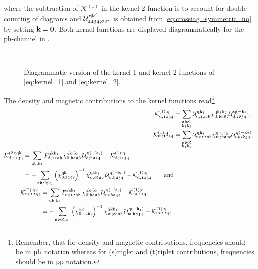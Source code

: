 \documentclass[../../main.tex]{subfiles}
\begin{document}
where the subtraction of $\mathcal{K}^{(1)}$ in the kernel-2 function is to account for double-counting of diagrams and $\mathcal{U}^{\textbf{qk}'}_{\mathfrak{1234};\sigma\sigma'}$ is obtained from \eqref{eq:crossing_symmetric_uq} by setting $\textbf{k}=\textbf{0}$. Both kernel functions are displayed diagrammatically for the ph-channel in .
\begin{figure}[ht!]
  \centering
  \subfloat{}\\[0.5cm]
  \hspace{-0.25cm}\subfloat{}
  \caption{Diagrammatic version of the kernel-1 and kernel-2 functions of \eqref{eq:kernel_1} and \eqref{eq:kernel_2}.}
  \label{fig:kernel_functions}
\end{figure}
The density and magnetic contributions to the kernel functions read\footnote{Remember, that for density and magnetic contributions, frequencies should be in $\text{ph}$ notation whereas for (s)inglet and (t)riplet contributions, frequencies should be in $\text{pp}$ notation.}
\begin{subequations}\label{eq:kernel_functions_dens_magn}
\begin{align}
	\mathcal{K}^{(1);\text{q}}_{\text{d};\mathfrak{1234}}&=\sum_{\substack{\mathfrak{abcd}\\\text{k}_1\text{k}_2}} \mathcal{U}^{\textbf{q}\textbf{k}_1}_{\text{d};\mathfrak{12ab}} \chi^{\text{q}\text{k}_1\text{k}_2}_{\text{d};\mathfrak{badc}} \mathcal{U}^{\textbf{q}(-\textbf{k}_2)}_{\text{d};\mathfrak{cd34}},\\
	\mathcal{K}^{(1);\text{q}}_{\text{m};\mathfrak{1234}}&=\sum_{\substack{\mathfrak{abcd}\\\text{k}_1\text{k}_2}} \mathcal{U}^{\textbf{q}\textbf{k}_1}_{\text{m};\mathfrak{12ab}} \chi^{\text{q}\text{k}_1\text{k}_2}_{\text{m};\mathfrak{badc}} \mathcal{U}^{\textbf{q}(-\textbf{k}_2)}_{\text{m};\mathfrak{cd34}},\\
\begin{split}
	\mathcal{K}^{(2);\text{q}\text{k}}_{\text{d};\mathfrak{1234}}&=\sum_{\mathfrak{ab};\text{k}_1} F^{\text{q}\text{k}\text{k}_1}_{\text{d};\mathfrak{12ab}}\,\chi^{\text{q}\text{k}_1\text{k}_1}_{0;\mathfrak{baab}}\,\mathcal{U}^{\textbf{q}(-\textbf{k}_1)}_{\text{d};\mathfrak{ba34}}-\mathcal{K}^{(1);\text{q}}_{\text{d};\mathfrak{1234}}\\
	&=-\sum_{\mathfrak{abcd};\text{k}_1} \left (\chi_{0;\mathfrak{12dc}}^{\text{q}\text{k}}\right )^{-1}\chi^{\text{q}\text{k}\text{k}_1}_{\text{d};\mathfrak{cdab}}\,\mathcal{U}^{\textbf{q}(-\textbf{k}_1)}_{\text{d};\mathfrak{ba34}}-\mathcal{K}^{(1);\text{q}}_{\text{d};\mathfrak{1234}}\qquad\text{and}
\end{split}\\
\begin{split}
	\mathcal{K}^{(2);\text{q}\text{k}}_{\text{m};\mathfrak{1234}}&=\sum_{\mathfrak{ab};\text{k}_1} F^{\text{q}\text{k}\text{k}_1}_{\text{m};\mathfrak{12ab}}\,\chi^{\text{q}\text{k}_1\text{k}_1}_{0;\mathfrak{baab}}\,\mathcal{U}^{\textbf{q}(-\textbf{k}_1)}_{\text{m};\mathfrak{ba34}}-\mathcal{K}^{(1);\text{q}}_{\text{m};\mathfrak{1234}}\\
	&=-\sum_{\mathfrak{abcd};\text{k}_1} \left (\chi_{0;\mathfrak{12dc}}^{\text{q}\text{k}}\right )^{-1}\chi^{\text{q}\text{k}\text{k}_1}_{\text{m};\mathfrak{cdab}}\,\mathcal{U}^{\textbf{q}(-\textbf{k}_1)}_{\text{m};\mathfrak{ba34}}-\mathcal{K}^{(1);\text{q}}_{\text{m};\mathfrak{1234}}.
\end{split}
\end{align}
\end{subequations}
\end{document}
